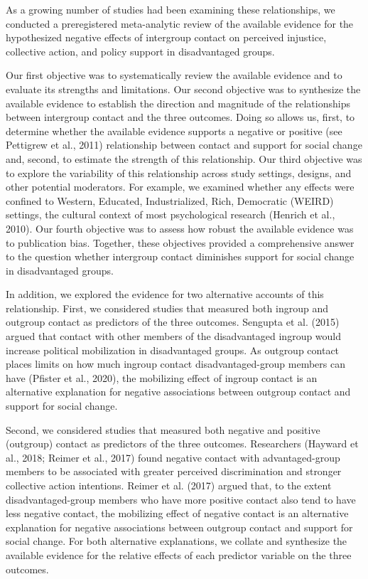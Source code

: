 \documentclass[twocolumn, 11pt, letterpaper]{article}
\begin{document}
As a growing number of studies had been examining these relationships,
we conducted a preregistered meta-analytic review of the available
evidence for the hypothesized negative effects of intergroup contact on
perceived injustice, collective action, and policy support in
disadvantaged groups.

Our first objective was to systematically review the available evidence
and to evaluate its strengths and limitations. Our second objective was
to synthesize the available evidence to establish the direction and
magnitude of the relationships between intergroup contact and the three
outcomes. Doing so allows us, first, to determine whether the available
evidence supports a negative or positive (see Pettigrew et al., 2011)
relationship between contact and support for social change and, second,
to estimate the strength of this relationship. Our third objective was
to explore the variability of this relationship across study settings,
designs, and other potential moderators. For example, we examined
whether any effects were confined to Western, Educated, Industrialized,
Rich, Democratic (WEIRD) settings, the cultural context of most
psychological research (Henrich et al., 2010). Our fourth objective was
to assess how robust the available evidence was to publication bias.
Together, these objectives provided a comprehensive answer to the
question whether intergroup contact diminishes support for social change
in disadvantaged groups.

In addition, we explored the evidence for two alternative accounts of
this relationship. First, we considered studies that measured both
ingroup and outgroup contact as predictors of the three outcomes.
Sengupta et al. (2015) argued that contact with other members of the
disadvantaged ingroup would increase political mobilization in
disadvantaged groups. As outgroup contact places limits on how much
ingroup contact disadvantaged-group members can have (Pfister et al.,
2020), the mobilizing effect of ingroup contact is an alternative
explanation for negative associations between outgroup contact and
support for social change.

Second, we considered studies that measured both negative and positive
(outgroup) contact as predictors of the three outcomes. Researchers
(Hayward et al., 2018; Reimer et al., 2017) found negative contact with
advantaged-group members to be associated with greater perceived
discrimination and stronger collective action intentions. Reimer et al.
(2017) argued that, to the extent disadvantaged-group members who have
more positive contact also tend to have less negative contact, the
mobilizing effect of negative contact is an alternative explanation for
negative associations between outgroup contact and support for social
change. For both alternative explanations, we collate and synthesize the
available evidence for the relative effects of each predictor variable
on the three outcomes.
\end{document}
